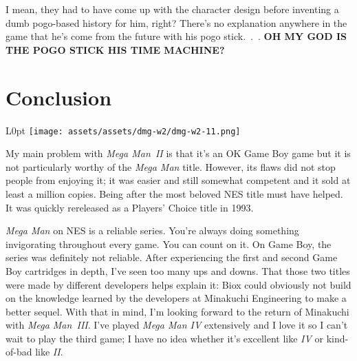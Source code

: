 \documentclass{book}
\let\oldcenter\center
\let\oldendcenter\endcenter
\renewenvironment{center}{\setlength\topsep{0pt}\oldcenter}{\oldendcenter}
\begin{document}
I mean, they had to have come up with the character design before inventing a dumb pogo-based history for him, right? There’s no explanation anywhere in the game that he’s come from the future with his pogo stick. . . \textbf{OH MY GOD IS THE POGO STICK HIS TIME MACHINE?}

\begin{center}
\vspace{8pt}
\quad\vspace{4pt}
\quad\vspace{4pt}
\end{center}

\FloatBarrier\needspace{5pt}\section*{Conclusion}\nopagebreak[4]

\begin{wrapfigure}{L}{0pt} \texttt{[image: assets/assets/dmg-w2/dmg-w2-11.png]}\end{wrapfigure}
My main problem with \emph{Mega Man II} is that it’s an OK Game Boy game but it is not particularly worthy of the \emph{Mega Man} title. However, its flaws did not stop people from enjoying it; it was easier and still somewhat competent and it sold at least a million copies. Being after the most beloved NES title must have helped. It was quickly rereleased as a Players’ Choice title in 1993.

\emph{Mega Man} on NES is a reliable series. You’re always doing something invigorating throughout every game. You can count on it. On Game Boy, the series was definitely not reliable. After experiencing the first and second Game Boy cartridges in depth, I’ve seen too many ups and downs. That those two titles were made by different developers helps explain it: Biox could obviously not build on the knowledge learned by the developers at Minakuchi Engineering to make a better sequel. With that in mind, I’m looking forward to the return of Minakuchi with \emph{Mega Man III}. I’ve played \emph{Mega Man IV} extensively and I love it so I can’t wait to play the third game; I have no idea whether it’s excellent like \emph{IV} or kind-of-bad like \emph{II}.
\end{document}

